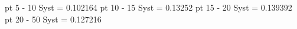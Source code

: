 pt 5 - 10   Syst = 0.102164
pt 10 - 15   Syst = 0.13252
pt 15 - 20   Syst = 0.139392
pt 20 - 50   Syst = 0.127216
